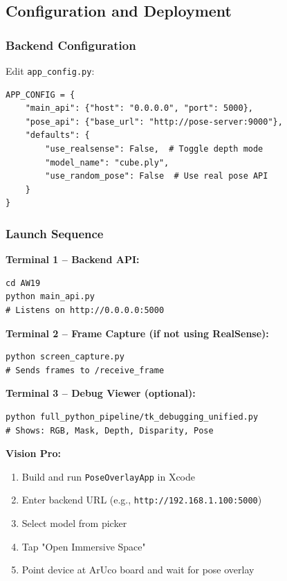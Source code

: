 \subsection{Configuration and Deployment}

\subsubsection{Backend Configuration}

Edit \texttt{app\_config.py}:

\begin{verbatim}
APP_CONFIG = {
    "main_api": {"host": "0.0.0.0", "port": 5000},
    "pose_api": {"base_url": "http://pose-server:9000"},
    "defaults": {
        "use_realsense": False,  # Toggle depth mode
        "model_name": "cube.ply",
        "use_random_pose": False  # Use real pose API
    }
}
\end{verbatim}

\subsubsection{Launch Sequence}

\textbf{Terminal 1 -- Backend API:}
\begin{verbatim}
cd AW19
python main_api.py
# Listens on http://0.0.0.0:5000
\end{verbatim}

\textbf{Terminal 2 -- Frame Capture (if not using RealSense):}
\begin{verbatim}
python screen_capture.py
# Sends frames to /receive_frame
\end{verbatim}

\textbf{Terminal 3 -- Debug Viewer (optional):}
\begin{verbatim}
python full_python_pipeline/tk_debugging_unified.py
# Shows: RGB, Mask, Depth, Disparity, Pose
\end{verbatim}

\textbf{Vision Pro:}
\begin{enumerate}
    \item Build and run \texttt{PoseOverlayApp} in Xcode
    \item Enter backend URL (e.g., \texttt{http://192.168.1.100:5000})
    \item Select model from picker
    \item Tap "Open Immersive Space"
    \item Point device at ArUco board and wait for pose overlay
\end{enumerate}

